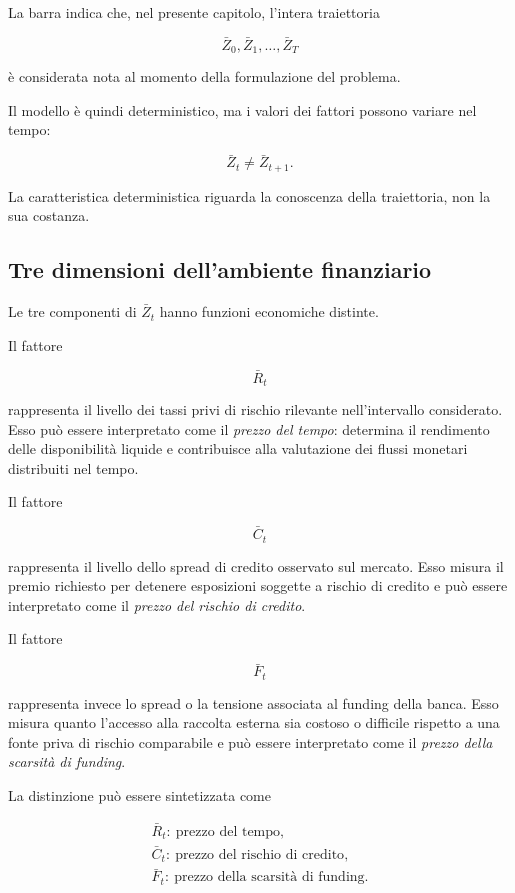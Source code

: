 La barra indica che, nel presente capitolo, l'intera traiettoria

\[
\bar{Z}_0,\bar{Z}_1,\ldots,\bar{Z}_T
\]

\noindent \`e considerata nota al momento della formulazione del problema.

Il modello \`e quindi deterministico, ma i valori dei fattori possono variare
nel tempo:

\[
\bar{Z}_t
\neq
\bar{Z}_{t+1}.
\]

La caratteristica deterministica riguarda la conoscenza della traiettoria,
non la sua costanza.

\subsection{Tre dimensioni dell'ambiente finanziario}

Le tre componenti di $\bar{Z}_t$ hanno funzioni economiche distinte.

Il fattore

\[
\bar{R}_t
\]

\noindent rappresenta il livello dei tassi privi di rischio rilevante nell'intervallo
considerato. Esso pu\`o essere interpretato come il \emph{prezzo del tempo}:
determina il rendimento delle disponibilit\`a liquide e contribuisce alla
valutazione dei flussi monetari distribuiti nel tempo.

Il fattore

\[
\bar{C}_t
\]

\noindent rappresenta il livello dello spread di credito osservato sul mercato. Esso
misura il premio richiesto per detenere esposizioni soggette a rischio di
credito e pu\`o essere interpretato come il \emph{prezzo del rischio di
credito}.

Il fattore

\[
\bar{F}_t
\]

\noindent rappresenta invece lo spread o la tensione associata al funding della banca.
Esso misura quanto l'accesso alla raccolta esterna sia costoso o difficile
rispetto a una fonte priva di rischio comparabile e pu\`o essere interpretato
come il \emph{prezzo della scarsit\`a di funding}.

La distinzione pu\`o essere sintetizzata come

\[
\boxed{
\begin{array}{c}
\bar{R}_t:\ \text{prezzo del tempo},\\[3pt]
\bar{C}_t:\ \text{prezzo del rischio di credito},\\[3pt]
\bar{F}_t:\ \text{prezzo della scarsit\`a di funding}.
\end{array}
}
\]

